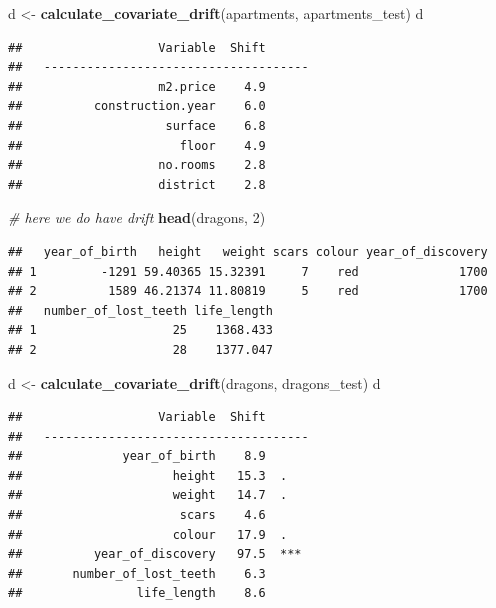 \documentclass[]{krantz}
\newenvironment{Shaded}{\begin{snugshade}}{\end{snugshade}}
\newcommand{\CommentTok}[1]{\textcolor[rgb]{0.56,0.35,0.01}{\textit{#1}}}
\newcommand{\DecValTok}[1]{\textcolor[rgb]{0.00,0.00,0.81}{#1}}
\newcommand{\KeywordTok}[1]{\textcolor[rgb]{0.13,0.29,0.53}{\textbf{#1}}}
\newcommand{\NormalTok}[1]{#1}
\newcommand{\StringTok}[1]{\textcolor[rgb]{0.31,0.60,0.02}{#1}}
\theoremstyle{definition}
\theoremstyle{definition}
\theoremstyle{definition}
\theoremstyle{remark}
\begin{document}
\begin{Shaded}
\begin{Highlighting}[]
\NormalTok{d <-}\StringTok{ }\KeywordTok{calculate_covariate_drift}\NormalTok{(apartments, apartments_test)}
\NormalTok{d}
\end{Highlighting}
\end{Shaded}

\begin{verbatim}
##                   Variable  Shift
##   -------------------------------------
##                   m2.price    4.9  
##          construction.year    6.0  
##                    surface    6.8  
##                      floor    4.9  
##                   no.rooms    2.8  
##                   district    2.8
\end{verbatim}

\begin{Shaded}
\begin{Highlighting}[]
\CommentTok{# here we do have drift}
\KeywordTok{head}\NormalTok{(dragons, }\DecValTok{2}\NormalTok{)}
\end{Highlighting}
\end{Shaded}

\begin{verbatim}
##   year_of_birth   height   weight scars colour year_of_discovery
## 1         -1291 59.40365 15.32391     7    red              1700
## 2          1589 46.21374 11.80819     5    red              1700
##   number_of_lost_teeth life_length
## 1                   25    1368.433
## 2                   28    1377.047
\end{verbatim}

\begin{Shaded}
\begin{Highlighting}[]
\NormalTok{d <-}\StringTok{ }\KeywordTok{calculate_covariate_drift}\NormalTok{(dragons, dragons_test)}
\NormalTok{d}
\end{Highlighting}
\end{Shaded}

\begin{verbatim}
##                   Variable  Shift
##   -------------------------------------
##              year_of_birth    8.9  
##                     height   15.3  .
##                     weight   14.7  .
##                      scars    4.6  
##                     colour   17.9  .
##          year_of_discovery   97.5  ***
##       number_of_lost_teeth    6.3  
##                life_length    8.6
\end{verbatim}
\end{document}
